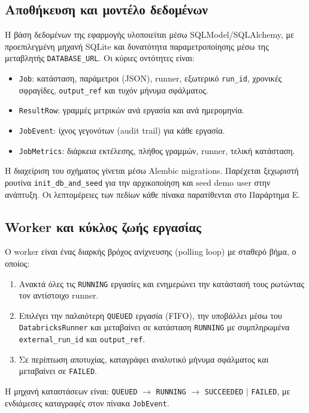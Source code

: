 \documentclass[12pt]{article}
\begin{document}
\subsection{Αποθήκευση και μοντέλο δεδομένων}
Η βάση δεδομένων της εφαρμογής υλοποιείται μέσω SQLModel/SQLAlchemy, με προεπιλεγμένη μηχανή SQLite και δυνατότητα παραμετροποίησης μέσω της μεταβλητής \texttt{DATABASE\_URL}. Οι κύριες οντότητες είναι:
\begin{itemize}
  \item \texttt{Job}: κατάσταση, παράμετροι (JSON), runner, εξωτερικό \texttt{run\_id}, χρονικές σφραγίδες, \texttt{output\_ref} και τυχόν μήνυμα σφάλματος.
  \item \texttt{ResultRow}: γραμμές μετρικών ανά εργασία και ανά ημερομηνία.
  \item \texttt{JobEvent}: ίχνος γεγονότων (audit trail) για κάθε εργασία.
  \item \texttt{JobMetrics}: διάρκεια εκτέλεσης, πλήθος γραμμών, runner, τελική κατάσταση.
\end{itemize}
Η διαχείριση του σχήματος γίνεται μέσω Alembic migrations. Παρέχεται ξεχωριστή ρουτίνα \texttt{init\_db\_and\_seed} για την αρχικοποίηση και seed demo user στην ανάπτυξη. Οι λεπτομέρειες των πεδίων κάθε πίνακα παρατίθενται στο Παράρτημα Ε.



\subsection{Worker και κύκλος ζωής εργασίας}
Ο worker είναι ένας διαρκής βρόχος ανίχνευσης (polling loop) με σταθερό βήμα, ο οποίος:
\begin{enumerate}
  \item Ανακτά όλες τις \texttt{RUNNING} εργασίες και ενημερώνει την κατάστασή τους ρωτώντας τον αντίστοιχο runner.
  \item Επιλέγει την παλαιότερη \texttt{QUEUED} εργασία (FIFO), την υποβάλλει μέσω του \texttt{DatabricksRunner} και μεταβαίνει σε κατάσταση \texttt{RUNNING} με συμπληρωμένα \texttt{external\_run\_id} και \texttt{output\_ref}.
  \item Σε περίπτωση αποτυχίας, καταγράφει αναλυτικό μήνυμα σφάλματος και μεταβαίνει σε \texttt{FAILED}.
\end{enumerate}
Η μηχανή καταστάσεων είναι: \texttt{QUEUED} $\to$ \texttt{RUNNING} $\to$ \texttt{SUCCEEDED} $\mid$ \texttt{FAILED}, με ενδιάμεσες καταγραφές στον πίνακα \texttt{JobEvent}.
\end{document}
